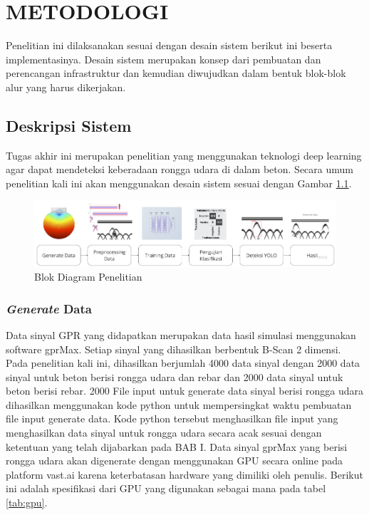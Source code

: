 \chapter{METODOLOGI}
\label{chap:metodologi}


Penelitian ini dilaksanakan sesuai dengan desain sistem berikut ini beserta implementasinya. Desain sistem merupakan konsep dari pembuatan dan perencangan infrastruktur dan kemudian diwujudkan dalam bentuk blok-blok alur yang harus dikerjakan.

\section{Deskripsi Sistem}
\label{sec:deskripsisistem}

Tugas akhir ini merupakan penelitian yang menggunakan teknologi deep learning agar dapat mendeteksi keberadaan rongga udara di dalam beton. Secara umum penelitian kali ini akan menggunakan desain sistem sesuai dengan Gambar \ref{fig:metodologi}.

\begin{figure} [H] \centering
  \includegraphics[scale=0.1]{gambar/bab3/flow.png}
  \caption{Blok Diagram Penelitian}
  \label{fig:metodologi}
\end{figure}

\subsection{\emph{Generate} Data}
Data sinyal GPR yang didapatkan merupakan data hasil simulasi menggunakan software gprMax. Setiap sinyal yang dihasilkan berbentuk B-Scan 2 dimensi. Pada penelitian kali ini, dihasilkan berjumlah 4000 data sinyal dengan 2000 data sinyal untuk beton berisi rongga udara dan rebar dan 2000 data sinyal untuk beton berisi rebar. 2000 File input untuk generate data sinyal berisi rongga udara dihasilkan menggunakan kode python untuk mempersingkat waktu pembuatan file input generate data. Kode python tersebut menghasilkan file input yang menghasilkan data sinyal untuk rongga udara secara acak sesuai dengan ketentuan yang telah dijabarkan pada BAB I. Data sinyal gprMax yang berisi rongga udara akan digenerate dengan menggunakan GPU secara online pada platform vast.ai karena keterbatasan hardware yang dimiliki oleh penulis. Berikut ini adalah spesifikasi dari GPU yang digunakan sebagai mana pada tabel \ref{tab:gpu}.

